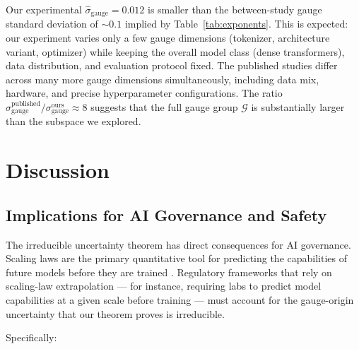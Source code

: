 \documentclass[12pt,a4paper]{article}
\theoremstyle{remark}
\begin{document}
Our experimental $\hat{\sigma}_{\text{gauge}} = 0.012$ is smaller than the between-study gauge standard deviation of $\sim 0.1$ implied by Table~\ref{tab:exponents}. This is expected: our experiment varies only a few gauge dimensions (tokenizer, architecture variant, optimizer) while keeping the overall model class (dense transformers), data distribution, and evaluation protocol fixed. The published studies differ across many more gauge dimensions simultaneously, including data mix, hardware, and precise hyperparameter configurations. The ratio $\sigma_{\text{gauge}}^{\text{published}} / \sigma_{\text{gauge}}^{\text{ours}} \approx 8$ suggests that the full gauge group $\mathcal{G}$ is substantially larger than the subspace we explored.

\section{Discussion}
\label{sec:discussion}

\subsection{Implications for AI Governance and Safety}

The irreducible uncertainty theorem has direct consequences for AI governance. Scaling laws are the primary quantitative tool for predicting the capabilities of future models before they are trained \cite{kaplan2020scaling, hoffmann2022training, askell2019anomalous, ganguli2022predictability}. Regulatory frameworks that rely on scaling-law extrapolation — for instance, requiring labs to predict model capabilities at a given scale before training — must account for the gauge-origin uncertainty that our theorem proves is irreducible.

Specifically:
\end{document}
